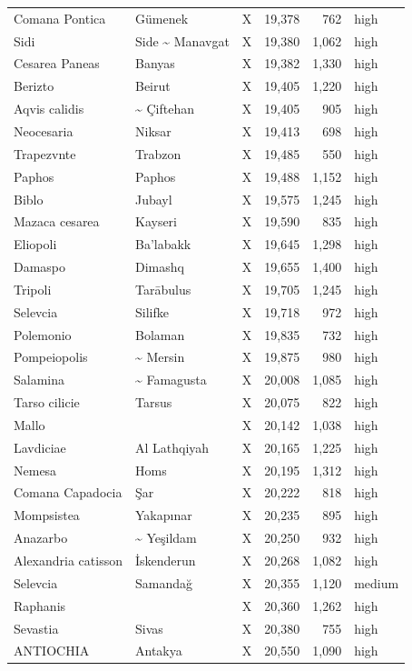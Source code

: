 \documentclass[11pt,a4paper]{article}
\begin{document}
{\begin{longtable}{p{4.6cm}p{5.2cm}lrrl}
Comana Pontica & Gümenek & X & 19,378 & 762 & high\\
Sidi & Side \textasciitilde{} Manavgat & X & 19,380 & 1,062 & high\\
Cesarea Paneas & Banyas & X & 19,382 & 1,330 & high\\
Berizto & Beirut & X & 19,405 & 1,220 & high\\
Aqvis calidis & \textasciitilde{} Çiftehan & X & 19,405 & 905 & high\\
Neocesaria & Niksar & X & 19,413 & 698 & high\\
Trapezvnte & Trabzon & X & 19,485 & 550 & high\\
Paphos & Paphos & X & 19,488 & 1,152 & high\\
Biblo & Jubayl & X & 19,575 & 1,245 & high\\
Mazaca cesarea & Kayseri & X & 19,590 & 835 & high\\
Eliopoli & Ba'labakk & X & 19,645 & 1,298 & high\\
Damaspo & Dimashq & X & 19,655 & 1,400 & high\\
Tripoli & Tarābulus & X & 19,705 & 1,245 & high\\
Selevcia & Silifke & X & 19,718 & 972 & high\\
Polemonio & Bolaman & X & 19,835 & 732 & high\\
Pompeiopolis & \textasciitilde{} Mersin & X & 19,875 & 980 & high\\
Salamina & \textasciitilde{} Famagusta & X & 20,008 & 1,085 & high\\
Tarso cilicie & Tarsus & X & 20,075 & 822 & high\\
Mallo &  & X & 20,142 & 1,038 & high\\
Lavdiciae & Al Lathqiyah & X & 20,165 & 1,225 & high\\
Nemesa & Homs & X & 20,195 & 1,312 & high\\
Comana Capadocia & Şar & X & 20,222 & 818 & high\\
Mompsistea & Yakapınar & X & 20,235 & 895 & high\\
Anazarbo & \textasciitilde{} Yeşildam & X & 20,250 & 932 & high\\
Alexandria catisson & İskenderun & X & 20,268 & 1,082 & high\\
Selevcia & Samandağ & X & 20,355 & 1,120 & medium\\
Raphanis &  & X & 20,360 & 1,262 & high\\
Sevastia & Sivas & X & 20,380 & 755 & high\\
ANTIOCHIA & Antakya & X & 20,550 & 1,090 & high\\

\end{longtable}}
\end{document}
